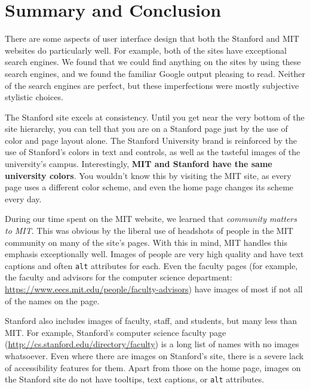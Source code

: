 \section*{Summary and Conclusion}

There are some aspects of user interface design that both the Stanford and MIT
websites do particularly well. For example, both of the sites have exceptional
search engines. We found that we could find anything on the sites by using
these search engines, and we found the familiar Google output pleasing to
read. Neither of the search engines are perfect, but these imperfections were
mostly subjective stylistic choices.

The Stanford site excels at consistency. Until you get near the very bottom of the
site hierarchy, you can tell that you are on a Stanford page just by the use of
color and page layout alone. The Stanford University brand is reinforced by the
use of Stanford's colors in text and controls, as well as the tasteful images
of the university's campus. Interestingly, \textbf{MIT and Stanford have the
same university colors}. You wouldn't know this by visiting the MIT site, as
every page uses a different color scheme, and even the home page changes its
scheme every day.

During our time spent on the MIT website, we learned that \textit{community
matters to MIT}. This was obvious by the liberal use of headshots of people in
the MIT community on many of the site's pages. With this in mind, MIT handles
this emphasis exceptionally well. Images of people are very high quality and
have text captions and often \texttt{alt} attributes for each. Even the faculty
pages (for example, the faculty and advisors for the computer science department:
\url{https://www.eecs.mit.edu/people/faculty-advisors}) have images of most if
not all of the names on the page.

Stanford also includes images of faculty, staff, and students, but many less
than MIT. For example, Stanford's computer science faculty page
(\url{http://cs.stanford.edu/directory/faculty}) is a long list of names
with no images whatsoever. Even where there are images on Stanford's site,
there is a severe lack of accessibility features for them. Apart from those
on the home page, images on the Stanford site do not have tooltips, text
captions, or \texttt{alt} attributes.